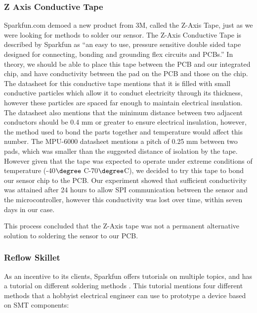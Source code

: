 \subsubsection{Z Axis Conductive Tape}
\label{Sec:ZTape}
Sparkfun.com demoed \cite{Web:SFETAPEV} a new product from 3M,
called the Z-Axis Tape,
just as we were looking for methods to solder our sensor.
The Z-Axis Conductive Tape is described by Sparkfun as ``an easy to use,
pressure sensitive double sided tape designed for connecting,
bonding and grounding flex circuits and PCBs.''
In theory, we should be able to place this tape between the PCB and our integrated chip,
and have conductivity between the pad on the PCB and those on the chip.
The datasheet for this conductive tape mentions that it is filled with small conductive particles which allow it to conduct electricity through its thickness,
however these particles are spaced far enough to maintain electrical insulation.
The datasheet also mentions that the minimum distance between two adjacent conductors should be 0.4 mm or greater to ensure electrical insulation,
however, the method used to bond the parts together and temperature would affect this number.
The MPU-6000 datasheet mentions a pitch of 0.25 mm between two pads,
which was smaller than the suggested distance of isolation by the tape.
However given that the tape was expected to operate under extreme conditions of temperature (-40$\degree$ C-70$\degree$C),
we decided to try this tape to bond our sensor chip to the PCB.
Our experiment showed that sufficient conductivity was attained after 24 hours to allow SPI communication between the sensor and the microcontroller,
however this conductivity was lost over time,
within seven days in our case.

This process concluded that the Z-Axis tape was not a permanent alternative solution to soldering the sensor to our PCB.

\subsubsection{Reflow Skillet}
\label{Sec:ToasterReflow}
As an incentive to its clients,
Sparkfun offers tutorials on multiple topics,
and has a tutorial on different soldering methods \cite{Web:SparkfunSoldering}.
This tutorial mentions four different methods that a hobbyist electrical engineer can use to prototype a device based on SMT components:

